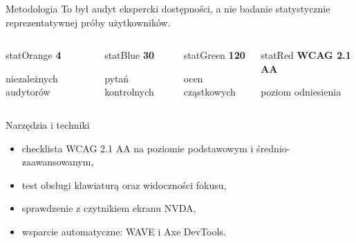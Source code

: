 \documentclass[aspectratio=169,11pt]{beamer}
\newcommand{\tagline}[1]{\textcolor{Slate}{\small #1}}
\newcommand{\statbox}[3]{
  \begin{beamercolorbox}[wd=\linewidth,rounded=true,sep=0.6em,center]{#1}
    {\Large\bfseries #2}\par
    {\scriptsize #3}
  \end{beamercolorbox}
}
\begin{document}
\begin{frame}{Metodologia}
  \tagline{To był audyt ekspercki dostępności, a nie badanie statystycznie reprezentatywnej próby użytkowników.}

  \vspace{0.35cm}
  \begin{columns}[T,totalwidth=\textwidth]
      \statbox{statOrange}{4}{niezależnych audytorów}
      \statbox{statBlue}{30}{pytań kontrolnych}
      \statbox{statGreen}{120}{ocen cząstkowych}
      \statbox{statRed}{WCAG 2.1 AA}{poziom odniesienia}
  \end{columns}

  \vspace{0.55cm}
  \begin{block}{Narzędzia i techniki}
    \begin{itemize}
      \item checklista WCAG 2.1 AA na poziomie podstawowym i średnio-zaawansowanym,
      \item test obsługi klawiaturą oraz widoczności fokusu,
      \item sprawdzenie z czytnikiem ekranu NVDA,
      \item wsparcie automatyczne: WAVE i Axe DevTools.
    \end{itemize}
  \end{block}
\end{frame}
\end{document}
